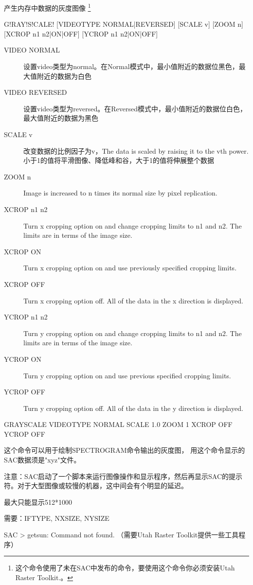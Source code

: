 \label{cmd:grayscale}

产生内存中数据的灰度图像
\footnote{
这个命令使用了未在SAC中发布的命令，要使用这个命令你必须安装Utah Raster Toolkit.。
}

\begin{SACSTX}
G!RAY!S!CALE! [VIDEOTYPE NORMAL|REVERSED] [SCALE v] [ZOOM n]
    [XCROP n1 n2|ON|OFF] [YCROP n1 n2|ON|OFF]
\end{SACSTX}

\begin{description}
\item [VIDEO NORMAL] 设置video类型为normal。在Normal模式中，最小值附近的数据位黑色，最大值附近的数据为白色
\item [VIDEO REVERSED] 设置video类型为reversed。在Reversed模式中，最小值附近的数据位白色，最大值附近的数据为黑色
\item [SCALE v] 改变数据的比例因子为v，The data is scaled by raising it to the vth power.小于1的值将平滑图像、降低峰和谷，大于1的值将伸展整个数据
\item [ZOOM n] Image is increased to n times its normal size by pixel replication.
\item [XCROP n1 n2] Turn x cropping option on and change cropping limits to n1 and n2. The limits are in terms of the image size.
\item [XCROP ON] Turn x cropping option on and use previously specified cropping limits.
\item [XCROP OFF] Turn x cropping option off.  All of the data in the x direction is displayed.
\item [YCROP n1 n2] Turn y cropping option on and change cropping limits to n1 and n2. The limits are in terms of the image size.
\item [YCROP ON] Turn y cropping option on and use previous specified cropping limits.
\item [YCROP OFF] Turn y cropping option off.  All of the data in the y direction is displayed.
\end{description}

\begin{SACDFT}
GRAYSCALE VIDEOTYPE NORMAL SCALE 1.0 ZOOM 1 XCROP OFF YCROP OFF
\end{SACDFT}

这个命令可以用于绘制SPECTROGRAM命令输出的灰度图， 用这个命令显示的SAC数据须是"xyz"文件。

注意：SAC启动了一个脚本来运行图像操作和显示程序，然后再显示SAC的提示符。对于大型图像或较慢的机器，这中间会有个明显的延迟。

最大只能显示512*1000

需要：IFTYPE, NXSIZE, NYSIZE

SAC > getsun: Command not found.  （需要Utah Raster Toolkit提供一些工具程序）

